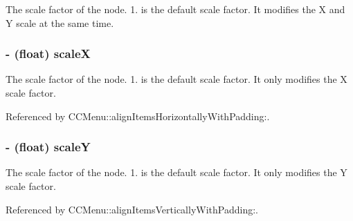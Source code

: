 The scale factor of the node. 1. is the default scale factor. It modifies the X and Y scale at the same time. \hypertarget{class_c_c_node_af98791d15ad50cac4131dadfec09d49f}{
\subsubsection[{scale\-X}]{\setlength{\rightskip}{0pt plus 5cm}-\/ (float) {\bf scale\-X}}}\label{class_c_c_node_af98791d15ad50cac4131dadfec09d49f}
The scale factor of the node. 1. is the default scale factor. It only modifies the X scale factor. 

Referenced by C\-C\-Menu\-::align\-Items\-Horizontally\-With\-Padding\-:.

\hypertarget{class_c_c_node_ad19816ebddb7b5da1564e2c97d1361e7}{
\subsubsection[{scale\-Y}]{\setlength{\rightskip}{0pt plus 5cm}-\/ (float) {\bf scale\-Y}}}\label{class_c_c_node_ad19816ebddb7b5da1564e2c97d1361e7}
The scale factor of the node. 1. is the default scale factor. It only modifies the Y scale factor. 

Referenced by C\-C\-Menu\-::align\-Items\-Vertically\-With\-Padding\-:.

